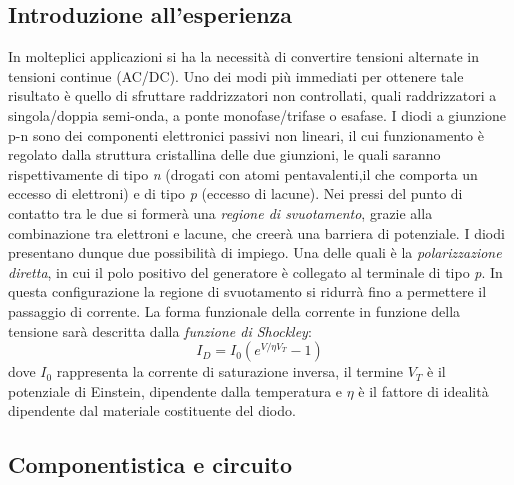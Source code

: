 \documentclass[journal]{IEEEtran}
\begin{document}
\subsection{\textbf{Introduzione all'esperienza}}
In molteplici applicazioni si ha la necessità di convertire tensioni alternate in tensioni continue (AC/DC). Uno dei modi più immediati per ottenere tale risultato è quello di sfruttare raddrizzatori non controllati, quali raddrizzatori a singola/doppia semi-onda, a ponte monofase/trifase o esafase.
I diodi a giunzione p-n sono dei componenti elettronici passivi non lineari, il cui funzionamento è regolato dalla struttura cristallina delle due giunzioni, le quali saranno rispettivamente di tipo \textit{n} (drogati con atomi pentavalenti,il che comporta un eccesso di elettroni) e di tipo \textit{p} (eccesso di lacune). Nei pressi del punto di contatto tra le due si formerà una \textit{regione di svuotamento}, grazie alla combinazione tra elettroni e lacune, che creerà una barriera di potenziale. I diodi presentano dunque due possibilità di impiego. Una delle quali è la \textit{polarizzazione diretta}, in cui il polo positivo del generatore è collegato al terminale di
tipo \textit{p}. In questa configurazione la regione di svuotamento si ridurrà fino a permettere il passaggio di corrente. La forma funzionale della corrente in funzione della tensione sarà descritta dalla \textit{funzione di Shockley}: 
\[I_{D} = I_{0}(e^{V/\eta V_T}-1)\] dove $I_{0}$ rappresenta la corrente di saturazione inversa, il termine $V_{T}$ è il potenziale di Einstein, dipendente dalla temperatura e $\eta$ è il fattore di idealità dipendente dal materiale costituente del diodo.
\subsection{\textbf{Componentistica e circuito}}
\end{document}
